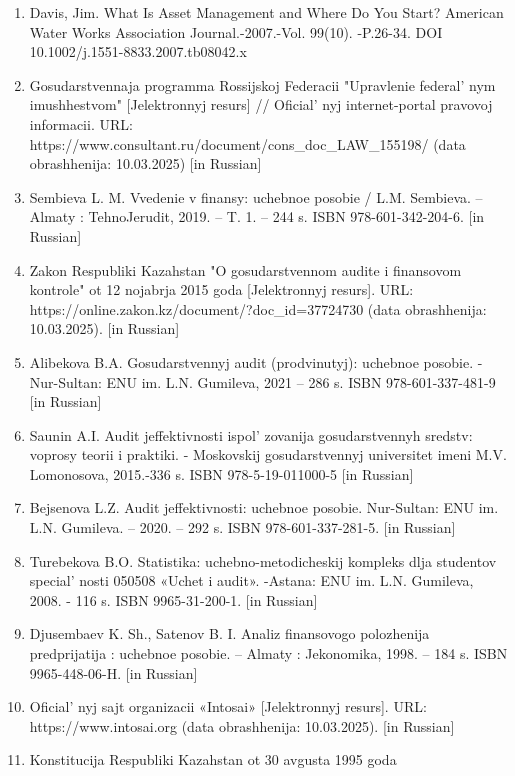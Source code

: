 \begin{enumerate}
\def\labelenumi{\arabic{enumi}.}
\item
  Davis, Jim. What Is Asset Management and Where Do You Start? American
  Water Works Association Journal.-2007.-Vol. 99(10). -P.26-34. DOI
  10.1002/j.1551-8833.2007.tb08042.x
\item
  Gosudarstvennaja programma Rossijskoj Federacii "Upravlenie
  federal' nym imushhestvom" {[}Jelektronnyj resurs{]} //
  Oficial' nyj internet-portal pravovoj informacii. URL:
  https://www.consultant.ru/document/cons\_doc\_LAW\_155198/ (data
  obrashhenija: 10.03.2025) {[}in Russian{]}
\item
  Sembieva L. M. Vvedenie v finansy: uchebnoe posobie / L.M. Sembieva.
  -- Almaty : TehnoJerudit, 2019. -- T. 1. -- 244 s. ISBN
  978-601-342-204-6. {[}in Russian{]}
\item
  Zakon Respubliki Kazahstan "O gosudarstvennom audite i finansovom
  kontrole" ot 12 nojabrja 2015 goda {[}Jelektronnyj resurs{]}. URL:
  https://online.zakon.kz/document/?doc\_id=37724730 (data obrashhenija:
  10.03.2025). {[}in Russian{]}
\item
  Alibekova B.A. Gosudarstvennyj audit (prodvinutyj): uchebnoe posobie.
  - Nur-Sultan: ENU im. L.N. Gumileva, 2021 -- 286 s. ISBN
  978-601-337-481-9 {[}in Russian{]}
\item
  Saunin A.I. Audit jeffektivnosti ispol' zovanija
  gosudarstvennyh sredstv: voprosy teorii i praktiki. - Moskovskij
  gosudarstvennyj universitet imeni M.V. Lomonosova, 2015.-336 s. ISBN
  978-5-19-011000-5 {[}in Russian{]}
\item
  Bejsenova L.Z. Audit jeffektivnosti: uchebnoe posobie. Nur-Sultan: ENU
  im. L.N. Gumileva. -- 2020. -- 292 s. ISBN 978-601-337-281-5. {[}in
  Russian{]}
\item
  Turebekova B.O. Statistika: uchebno-metodicheskij kompleks dlja
  studentov special' nosti 050508 «Uchet i audit».
  -Astana: ENU im. L.N. Gumileva, 2008. - 116 s. ISBN 9965-31-200-1.
  {[}in Russian{]}
\item
  Djusembaev K. Sh., Satenov B. I. Analiz finansovogo polozhenija
  predprijatija : uchebnoe posobie. -- Almaty : Jekonomika, 1998. -- 184
  s. ISBN 9965-448-06-H. {[}in Russian{]}
\item
  Oficial' nyj sajt organizacii «Intosai» {[}Jelektronnyj
  resurs{]}. URL: https://www.intosai.org (data obrashhenija:
  10.03.2025). {[}in Russian{]}
\item
  Konstitucija Respubliki Kazahstan ot 30 avgusta 1995 goda

\end{enumerate}
